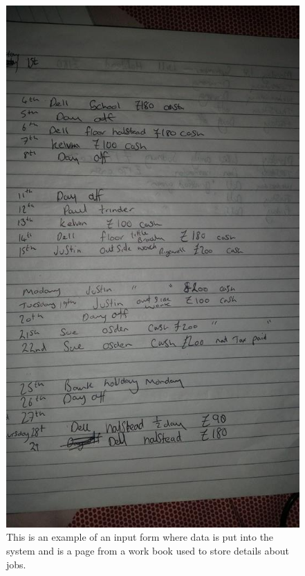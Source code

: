 \pagebreak


\begin{figure}[H]
    \includegraphics[width=\textwidth]{./Analysis/images/workbookPage.jpg}
    \caption{This is an example of an input form where data is put into the system and is a page from a work book used to store details about jobs.} \label{fig:work_book_page}
\end{figure}

